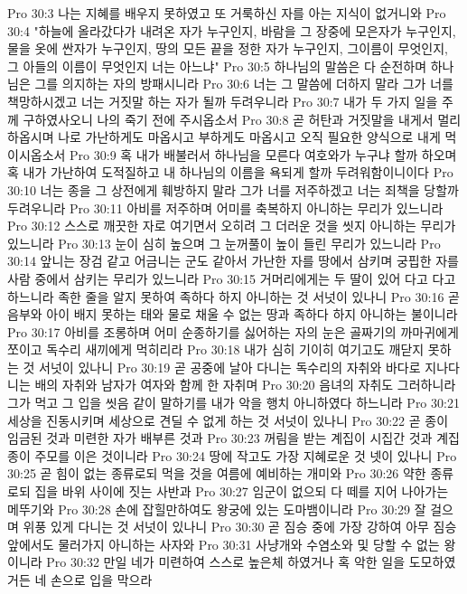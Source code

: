 Pro 30:3  나는 지혜를 배우지 못하였고 또 거룩하신 자를 아는 지식이 없거니와
Pro 30:4  "하늘에 올라갔다가 내려온 자가 누구인지, 바람을 그 장중에 모은자가 누구인지, 물을 옷에 싼자가 누구인지, 땅의 모든 끝을 정한 자가 누구인지, 그이름이 무엇인지, 그 아들의 이름이 무엇인지 너는 아느냐"
Pro 30:5  하나님의 말씀은 다 순전하며 하나님은 그를 의지하는 자의 방패시니라
Pro 30:6  너는 그 말씀에 더하지 말라 그가 너를 책망하시겠고 너는 거짓말 하는 자가 될까 두려우니라
Pro 30:7  내가 두 가지 일을 주께 구하였사오니 나의 죽기 전에 주시옵소서
Pro 30:8  곧 허탄과 거짓말을 내게서 멀리 하옵시며 나로 가난하게도 마옵시고 부하게도 마옵시고 오직 필요한 양식으로 내게 먹이시옵소서
Pro 30:9  혹 내가 배불러서 하나님을 모른다 여호와가 누구냐 할까 하오며 혹 내가 가난하여 도적질하고 내 하나님의 이름을 욕되게 할까 두려워함이니이다
Pro 30:10  너는 종을 그 상전에게 훼방하지 말라 그가 너를 저주하겠고 너는 죄책을 당할까 두려우니라
Pro 30:11  아비를 저주하며 어미를 축복하지 아니하는 무리가 있느니라
Pro 30:12  스스로 깨끗한 자로 여기면서 오히려 그 더러운 것을 씻지 아니하는 무리가 있느니라
Pro 30:13  눈이 심히 높으며 그 눈꺼풀이 높이 들린 무리가 있느니라
Pro 30:14  앞니는 장검 같고 어금니는 군도 같아서 가난한 자를 땅에서 삼키며 궁핍한 자를 사람 중에서 삼키는 무리가 있느니라
Pro 30:15  거머리에게는 두 딸이 있어 다고 다고 하느니라 족한 줄을 알지 못하여 족하다 하지 아니하는 것 서넛이 있나니
Pro 30:16  곧 음부와 아이 배지 못하는 태와 물로 채울 수 없는 땅과 족하다 하지 아니하는 불이니라
Pro 30:17  아비를 조롱하며 어미 순종하기를 싫어하는 자의 눈은 골짜기의 까마귀에게 쪼이고 독수리 새끼에게 먹히리라
Pro 30:18  내가 심히 기이히 여기고도 깨닫지 못하는 것 서넛이 있나니
Pro 30:19  곧 공중에 날아 다니는 독수리의 자취와 바다로 지나다니는 배의 자취와 남자가 여자와 함께 한 자취며
Pro 30:20  음녀의 자취도 그러하니라 그가 먹고 그 입을 씻음 같이 말하기를 내가 악을 행치 아니하였다 하느니라
Pro 30:21  세상을 진동시키며 세상으로 견딜 수 없게 하는 것 서넛이 있나니
Pro 30:22  곧 종이 임금된 것과 미련한 자가 배부른 것과
Pro 30:23  꺼림을 받는 계집이 시집간 것과 계집 종이 주모를 이은 것이니라
Pro 30:24  땅에 작고도 가장 지혜로운 것 넷이 있나니
Pro 30:25  곧 힘이 없는 종류로되 먹을 것을 여름에 예비하는 개미와
Pro 30:26  약한 종류로되 집을 바위 사이에 짓는 사반과
Pro 30:27  임군이 없으되 다 떼를 지어 나아가는 메뚜기와
Pro 30:28  손에 잡힐만하여도 왕궁에 있는 도마뱀이니라
Pro 30:29  잘 걸으며 위풍 있게 다니는 것 서넛이 있나니
Pro 30:30  곧 짐승 중에 가장 강하여 아무 짐승 앞에서도 물러가지 아니하는 사자와
Pro 30:31  사냥개와 수염소와 및 당할 수 없는 왕이니라
Pro 30:32  만일 네가 미련하여 스스로 높은체 하였거나 혹 악한 일을 도모하였거든 네 손으로 입을 막으라
